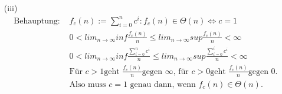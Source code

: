 \documentclass{article}
\begin{document}
\begin{enumerate}
\begin{enumerate}
\item[(iii)]
	\begin{align*}
	\text{Behauptung: } &f_c(n) := \sum_{i=0}^n c^i: f_c(n) \in \Theta(n) \Leftrightarrow c=1 \\
	&0 < lim_{n \rightarrow \infty} inf \frac{f_c(n)}{n} \le lim_{n \rightarrow \infty} sup \frac{f_c(n)}{n} < \infty \\
	&0 < lim_{n \rightarrow \infty} inf \frac{\sum_{i=0}^n c^i}{n} \le lim_{n \rightarrow \infty} sup \frac{\sum_{i=0}^i c^i}{n} < \infty \\
	&\text{Für } c > 1 \text{geht } \frac{f_c(n)}{n} \text{gegen } \infty \text{, für } c > 0 \text{geht }  \frac{f_c(n)}{n} \text{gegen 0.} \\
	&\text{Also muss } c = 1 \text{ genau dann, wenn } f_c(n) \in \Theta(n).
	\end{align*}
\end{enumerate}


\end{enumerate}
\end{document}
